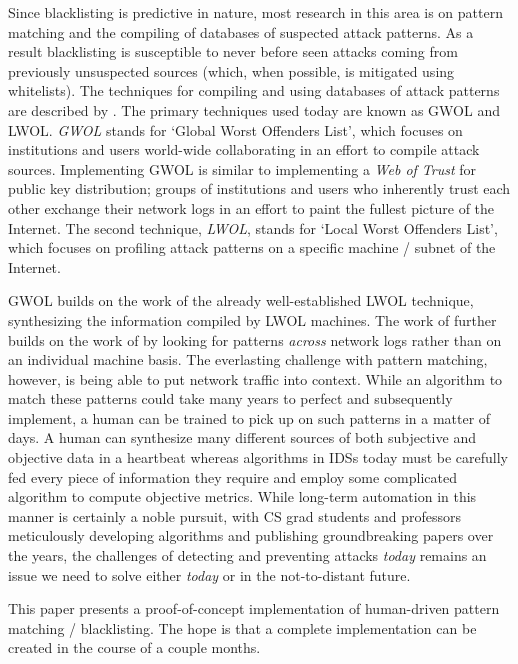 \documentclass[aps,preprint,amsmath,amssymb]{revtex4}
\begin{document}
Since blacklisting is predictive in nature, most research in this area is on pattern
matching and the compiling of databases of suspected attack patterns. As a result
blacklisting is susceptible to never before seen attacks coming from previously
unsuspected sources (which, when possible, is mitigated using whitelists). The techniques
for compiling and using databases of attack patterns are described by \cite{Zhang:2008}.
The primary techniques used today are known as GWOL and LWOL. \emph{GWOL} stands for
`Global Worst Offenders List', which focuses on institutions and users world-wide collaborating
in an effort to compile attack sources. Implementing GWOL is similar to implementing
a \emph{Web of Trust} for public key distribution; groups of institutions and users who
inherently trust each other exchange their network logs in an effort to paint the fullest
picture of the Internet. The second technique, \emph{LWOL}, stands for `Local Worst Offenders
List', which focuses on profiling attack patterns on a specific machine / subnet of the
Internet.

GWOL builds on the work of the already well-established LWOL technique, synthesizing
the information compiled by LWOL machines. The work of \cite{DBLP:journals} further builds
on the work of \cite{Zhang:2008} by looking for patterns \emph{across} network logs
rather than on an individual machine basis. The everlasting challenge with pattern
matching, however, is being able to put network traffic into context. While an
algorithm to match these patterns could take many years to perfect and subsequently
implement, a human can be trained to pick up on such patterns in a matter of days. 
A human can synthesize many different sources of both subjective and objective data
in a heartbeat whereas algorithms in IDSs today must be carefully fed every piece
of information they require and employ some complicated algorithm to compute objective
metrics. While long-term automation in this manner is certainly a noble pursuit, with
CS grad students and professors meticulously developing algorithms and publishing
groundbreaking papers over the years, the challenges of detecting and preventing attacks
\emph{today} remains an issue we need to solve either \emph{today} or in the
not-to-distant future.

This paper presents a proof-of-concept implementation of human-driven pattern matching /
blacklisting. The hope is that a complete implementation can be created in the course
of a couple months.

\end{document}
